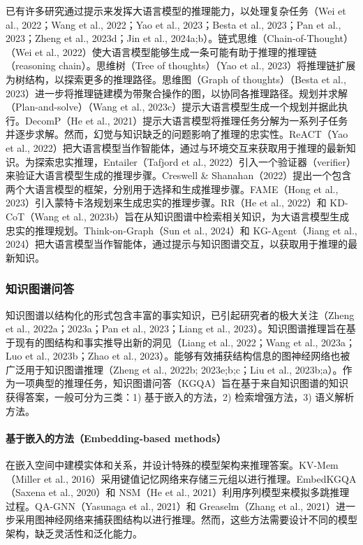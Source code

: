 \documentclass[11pt,UTF8,fontset=fandol]{ctexart}
\begin{document}
已有许多研究通过提示来发挥大语言模型的推理能力，以处理复杂任务（Wei et al., 2022；Wang et al., 2022；Yao et al., 2023；Besta et al., 2023；Pan et al., 2023；Zheng et al., 2023d；Jin et al., 2024a;b）。链式思维（Chain-of-Thought）（Wei et al., 2022）使大语言模型能够生成一条可能有助于推理的推理链（reasoning chain）。思维树（Tree of thoughts）（Yao et al., 2023）将推理链扩展为树结构，以探索更多的推理路径。思维图（Graph of thoughts）（Besta et al., 2023）进一步将推理链建模为带聚合操作的图，以协同各推理路径。规划并求解（Plan-and-solve）（Wang et al., 2023c）提示大语言模型生成一个规划并据此执行。DecomP（He et al., 2021）提示大语言模型将推理任务分解为一系列子任务并逐步求解。然而，幻觉与知识缺乏的问题影响了推理的忠实性。ReACT（Yao et al., 2022）把大语言模型当作智能体，通过与环境交互来获取用于推理的最新知识。为探索忠实推理，Entailer（Tafjord et al., 2022）引入一个验证器（verifier）来验证大语言模型生成的推理步骤。Creswell \& Shanahan（2022）提出一个包含两个大语言模型的框架，分别用于选择和生成推理步骤。FAME（Hong et al., 2023）引入蒙特卡洛规划来生成忠实的推理步骤。RR（He et al., 2022）和 KD-CoT（Wang et al., 2023b）旨在从知识图谱中检索相关知识，为大语言模型生成忠实的推理规划。Think-on-Graph（Sun et al., 2024）和 KG-Agent（Jiang et al., 2024）把大语言模型当作智能体，通过提示与知识图谱交互，以获取用于推理的最新知识。

\subsubsection{知识图谱问答}

知识图谱以结构化的形式包含丰富的事实知识，已引起研究者的极大关注（Zheng et al., 2022a；2023a；Pan et al., 2023；Liang et al., 2023）。知识图谱推理旨在基于现有的图结构和事实推导出新的洞见（Liang et al., 2022；Wang et al., 2023a；Luo et al., 2023b；Zhao et al., 2023）。能够有效捕获结构信息的图神经网络也被广泛用于知识图谱推理（Zheng et al., 2022b; 2023e;b;c；Liu et al., 2023b;a）。作为一项典型的推理任务，知识图谱问答（KGQA）旨在基于来自知识图谱的知识获得答案，一般可分为三类：1) 基于嵌入的方法，2) 检索增强方法，3) 语义解析方法。

\paragraph{基于嵌入的方法（Embedding-based methods）}
在嵌入空间中建模实体和关系，并设计特殊的模型架构来推理答案。KV-Mem（Miller et al., 2016）采用键值记忆网络来存储三元组以进行推理。EmbedKGQA（Saxena et al., 2020）和 NSM（He et al., 2021）利用序列模型来模拟多跳推理过程。QA-GNN（Yasunaga et al., 2021）和 Greaselm（Zhang et al., 2021）进一步采用图神经网络来捕获图结构以进行推理。然而，这些方法需要设计不同的模型架构，缺乏灵活性和泛化能力。
\end{document}
